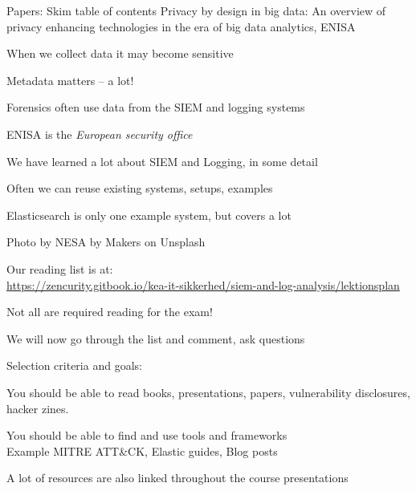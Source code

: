 \documentclass[Screen16to9,17pt]{foils}
\begin{document}

\begin{quote}

\end{quote}

\begin{list1}
\item Papers: Skim table of contents Privacy by design in big data: An overview of privacy enhancing technologies in the era of big data analytics, ENISA
\begin{list2}
\item When we collect data it may become sensitive
\item Metadata matters -- a lot!
\item Forensics often use data from the SIEM and logging systems
\item ENISA is the \emph{European security office}
\end{list2}
\end{list1}




\begin{list1}
\item We have learned a lot about SIEM and Logging, in some detail
\item Often we can reuse existing systems, setups, examples
\item Elasticsearch is only one example system, but covers a lot

\end{list1}
{\small \hfill Photo by NESA by Makers on Unsplash}


\begin{list1}
\item Our reading list is at:\\
{\footnotesize\url{https://zencurity.gitbook.io/kea-it-sikkerhed/siem-and-log-analysis/lektionsplan}}
\item Not all are required reading for the exam!
\item We will now go through the list and comment, ask questions
\item Selection criteria and goals:
\begin{list2}
\item You should be able to read books, presentations, papers, vulnerability disclosures, hacker zines.
\item You should be able to find and use tools and frameworks\\
Example MITRE ATT\&CK, Elastic guides, Blog posts
\end{list2}
\item A lot of resources are also linked throughout the course presentations
\end{list1}
\end{document}
